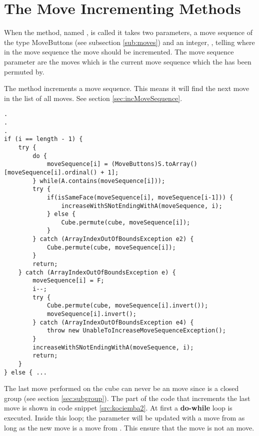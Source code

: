 \section{The Move Incrementing Methods}
\label{sec:increaseWithSNotEndingWithA}
When the method, named , is called it takes two parameters, a move sequence of the type MoveButtons (see subsection \ref{sub:moves}) and an integer, , telling where in the move sequence the move should be incremented. The move sequence parameter are the moves which is the current move sequence which the \cube{} has been permuted by.

The method increments a move sequence. This means it will find the next move in the list of all moves. See section \ref{sec:incMoveSequence}.


\begin{lstlisting}[style=sourceCode, caption=\myCaption{Key point in the incrementing method of kociemba's optimal solver}, label=src:kociemba2]
.
.
.
if (i == length - 1) {
	try {
		do {
			moveSequence[i] = (MoveButtons)S.toArray()[moveSequence[i].ordinal() + 1];
		} while(A.contains(moveSequence[i]));
		try {
			if(isSameFace(moveSequence[i], moveSequence[i-1])) {
				increaseWithSNotEndingWithA(moveSequence, i);
			} else {
				Cube.permute(cube, moveSequence[i]);
			}
		} catch (ArrayIndexOutOfBoundsException e2) {
			Cube.permute(cube, moveSequence[i]);
		}
		return;
	} catch (ArrayIndexOutOfBoundsException e) {
		moveSequence[i] = F;
		i--;
		try {
			Cube.permute(cube, moveSequence[i].invert());
			moveSequence[i].invert();
		} catch (ArrayIndexOutOfBoundsException e4) {
			throw new UnableToIncreaseMoveSequenceException();
		}
		increaseWithSNotEndingWithA(moveSequence, i);
		return;
	}
} else { ...
\end{lstlisting}

The last move performed on the cube can never be an  move since  is a closed group (see section \ref{sec:subgroup}). The part of the code that increments the last move is shown in code snippet \ref{src:kociemba2}.
At first a \textbf{do-while} loop is executed. 
Inside this loop; the parameter  will be updated with a move from  as long as the new move is a move from . This ensure that the move is not an  move.

